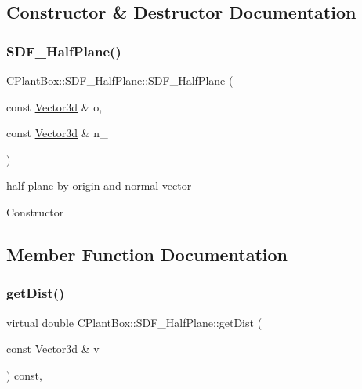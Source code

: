 \subsection{Constructor \& Destructor Documentation}
\mbox{\label{classCPlantBox_1_1SDF__HalfPlane_a3389c75eeecdde472a740580b015f649}} 
\subsubsection{\texorpdfstring{S\+D\+F\+\_\+\+Half\+Plane()}{SDF\_HalfPlane()}}
{\footnotesize\ttfamily C\+Plant\+Box\+::\+S\+D\+F\+\_\+\+Half\+Plane\+::\+S\+D\+F\+\_\+\+Half\+Plane (\begin{DoxyParamCaption}\item[{const \hyperlink{classCPlantBox_1_1Vector3d}{Vector3d} \&}]{o,  }\item[{const \hyperlink{classCPlantBox_1_1Vector3d}{Vector3d} \&}]{n\+\_\+ }\end{DoxyParamCaption})}



half plane by origin and normal vector 

Constructor 

\subsection{Member Function Documentation}
\mbox{\label{classCPlantBox_1_1SDF__HalfPlane_a2b3edca3db93d5a80e774baecd95d952}} 
\subsubsection{\texorpdfstring{get\+Dist()}{getDist()}}
{\footnotesize\ttfamily virtual double C\+Plant\+Box\+::\+S\+D\+F\+\_\+\+Half\+Plane\+::get\+Dist (\begin{DoxyParamCaption}\item[{const \hyperlink{classCPlantBox_1_1Vector3d}{Vector3d} \&}]{v }\end{DoxyParamCaption}) const\hspace{0.3cm}{\ttfamily [inline]}, {\ttfamily [virtual]}}

